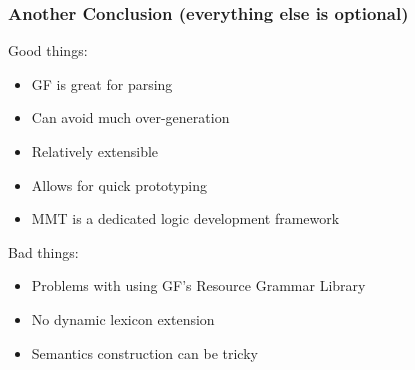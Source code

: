 \documentclass[aspectratio=149]{beamer}
\begin{document}


\begin{frame}
    \frametitle{Another Conclusion (everything else is optional)}
    Good things:
    \begin{itemize}
        \item GF is great for parsing
        \item Can avoid much over-generation
        \item Relatively extensible
        \item Allows for quick prototyping
        \item MMT is a dedicated logic development framework
    \end{itemize}

    Bad things:
    \begin{itemize}
        \item Problems with using GF's Resource Grammar Library
        \item No dynamic lexicon extension
        \item Semantics construction can be tricky
    \end{itemize}
\end{frame}




% 






% 
\end{document}
